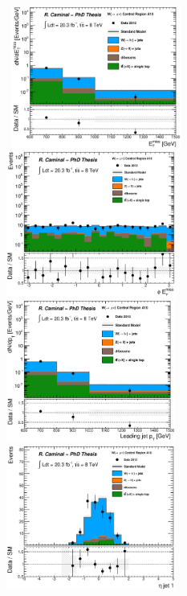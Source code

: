 \begin{figure}[!ht]
  \begin{center}
    \mbox{
      \includegraphics[width=0.495\textwidth]{Appendix_FluctuationM6/Figures/plot_Stop_A10_CRwmn_met_fitted.eps}
      \includegraphics[width=0.495\textwidth]{Appendix_FluctuationM6/Figures/plot_Stop_A10_CRwmn_met_phi_fitted.eps}
    }
    \mbox{
      \includegraphics[width=0.495\textwidth]{Appendix_FluctuationM6/Figures/plot_Stop_A10_CRwmn_pt1_fitted.eps}
      \includegraphics[width=0.495\textwidth]{Appendix_FluctuationM6/Figures/plot_Stop_A10_CRwmn_eta1_fitted.eps}
}
\end{center}
\end{figure}
